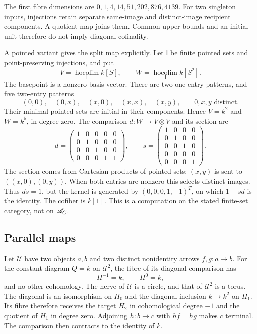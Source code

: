 The first fibre dimensions are $0,1,4,14,51,202,876,4139$.
For two singleton inputs, injections retain separate
same-image and distinct-image recipient components.
A quotient map joins them. Common upper bounds and an
initial unit therefore do not imply diagonal cofinality.

A pointed variant gives the split map explicitly.
Let $\mathsf I$ be finite pointed sets and
point-preserving injections, and put
\[
 V=\operatorname*{hocolim}_{\mathsf I}k[S],\qquad
 W=\operatorname*{hocolim}_{\mathsf I}k[S^2].
\]
The basepoint is a nonzero basis vector. There are two
one-entry patterns, and five two-entry patterns
\[
 (0,0),\quad(0,x),\quad(x,0),\quad(x,x),\quad(x,y),
       \qquad 0,x,y\text{ distinct}.
\]
Their minimal pointed sets are initial in their
components. Hence $V=k^2$ and $W=k^5$, in degree zero.
The comparison $d:W\to V\otimes V$ and its section are
\begin{equation}\label{eq:vol2-pointed-matrices}
 d=\begin{pmatrix}
 1&0&0&0&0\\0&1&0&0&0\\0&0&1&0&0\\0&0&0&1&1
 \end{pmatrix},\qquad
 s=\begin{pmatrix}
 1&0&0&0\\0&1&0&0\\0&0&1&0\\0&0&0&0\\0&0&0&1
 \end{pmatrix}.
\end{equation}
The section comes from Cartesian products of pointed
sets: $(x,y)$ is sent to $((x,0),(0,y))$.
When both entries are nonzero this selects distinct
images. Thus $ds=1$, but the kernel is generated by
$(0,0,0,1,-1)^T$, on which $1-sd$ is the identity.
The cofiber is $k[1]$. This is a computation on the
stated finite-set category, not on $\mathscr A_C$.

\subsection{Parallel maps}

Let $\mathcal U$ have two objects $a,b$ and two distinct
nonidentity arrows $f,g:a\to b$. For the constant
diagram $Q=k$ on $\mathcal U^2$, the fibre of its
diagonal comparison has
\[
 H^{-1}=k,\qquad H^0=k,
\]
and no other cohomology. The nerve of $\mathcal U$ is
a circle, and that of $\mathcal U^2$ is a torus.
The diagonal is an isomorphism on $H_0$ and the
diagonal inclusion $k\to k^2$ on $H_1$. Its fibre
therefore receives the target $H_2$ in cohomological
degree $-1$ and the quotient of $H_1$ in degree zero.
Adjoining $h:b\to c$ with $hf=hg$ makes $c$ terminal.
The comparison then contracts to the identity of $k$.

